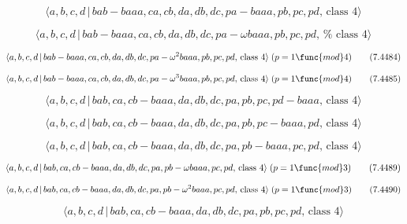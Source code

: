 \documentclass[10pt]{article}
\begin{document}
\begin{equation}
\langle a,b,c,d\,|\,bab-baaa,ca,cb,da,db,dc,pa-baaa,pb,pc,pd,\,\text{class }%
4\rangle  \tag{7.4482}
\end{equation}

\begin{equation}
\langle a,b,c,d\,|\,bab-baaa,ca,cb,da,db,dc,pa-\omega baaa,pb,pc,pd,\,\text{%
class }4\rangle  \tag{7.4483}
\end{equation}

\begin{equation}
\langle a,b,c,d\,|\,bab-baaa,ca,cb,da,db,dc,pa-\omega ^{2}baaa,pb,pc,pd,\,%
\text{class }4\rangle \;(p=1\func{mod}4)  \tag{7.4484}
\end{equation}

\begin{equation}
\langle a,b,c,d\,|\,bab-baaa,ca,cb,da,db,dc,pa-\omega ^{3}baaa,pb,pc,pd,\,%
\text{class }4\rangle \;(p=1\func{mod}4)  \tag{7.4485}
\end{equation}

\begin{equation}
\langle a,b,c,d\,|\,bab,ca,cb-baaa,da,db,dc,pa,pb,pc,pd-baaa,\,\text{class }%
4\rangle  \tag{7.4486}
\end{equation}

\begin{equation}
\langle a,b,c,d\,|\,bab,ca,cb-baaa,da,db,dc,pa,pb,pc-baaa,pd,\,\text{class }%
4\rangle  \tag{7.4487}
\end{equation}

\begin{equation}
\langle a,b,c,d\,|\,bab,ca,cb-baaa,da,db,dc,pa,pb-baaa,pc,pd,\,\text{class }%
4\rangle  \tag{7.4488}
\end{equation}

\begin{equation}
\langle a,b,c,d\,|\,bab,ca,cb-baaa,da,db,dc,pa,pb-\omega baaa,pc,pd,\,\text{%
class }4\rangle \;(p=1\func{mod}3)  \tag{7.4489}
\end{equation}

\begin{equation}
\langle a,b,c,d\,|\,bab,ca,cb-baaa,da,db,dc,pa,pb-\omega ^{2}baaa,pc,pd,\,%
\text{class }4\rangle \;(p=1\func{mod}3)  \tag{7.4490}
\end{equation}

\begin{equation}
\langle a,b,c,d\,|\,bab,ca,cb-baaa,da,db,dc,pa,pb,pc,pd,\,\text{class }%
4\rangle  \tag{7.4491}
\end{equation}
\end{document}
